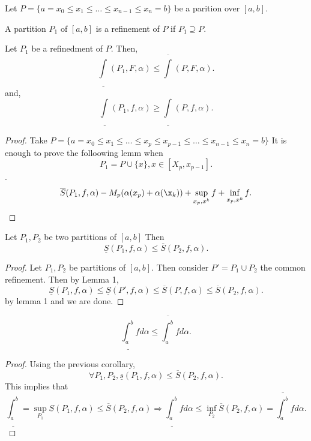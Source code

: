 \documentclass[a4paper]{article}
\newcommand{\upRint}[2]{
  \overline{\int_{#1}^{#2}}
}
\newcommand{\loRint}[2]{
  \underline{\int_{#1}^{#2}}
}
\begin{document}
Let $P = \{ a = x_0 \leq x_1 \leq \ldots \leq x_{n-1} \leq x_n = b\} $ be a parition over $[a,b]$.

 \begin{definition}
   A partition $P_1$ of $[a,b]$ is a refinement of  $P$ if  $P_1 \supseteq P$. 
\end{definition}

\begin{lemma}
  Let $P_1$ be a refinedment of $P$. Then,
  \[
    \loRint{}{}(P_1, F, \alpha) \leq \upRint{}{} (P, F, \alpha)
  .\] 
  and,
  \[
    \loRint{}{} (P_1, f, \alpha) \geq \loRint{}{} (P, f, \alpha) 
  .\] 

  \begin{proof}
    Take $P = \{a = x_0 \leq x_1 \leq \ldots \leq x_p \leq x_{p-1} \leq \ldots \leq x_{n-1} \leq x_n = b\} $ It is enough to prove the folloowing lemm when 
    \[
      P_1 = P \cup \{x\}, x \in [X_{p}, x_{p-1}] 
    .\].
    \begin{align*}
          \overline{S} (P_1, f, \alpha)  -M_{p}(\alpha (x_p) + \alpha(\x_k)) + \sup_{x_{p}, x^{k}} f + \inf_{x_p, x^{k}} f 
        .\end{align*}
  \end{proof}
\end{lemma}


\begin{corollary}
  Let $P_1, P_2$ be two partitions of $[a,b]$ Then 
   \[
     \underline{S} (P_1, f, \alpha) \leq \overline{S} (P_2, f, \alpha) 
  .\]

  \begin{proof}
    Let $P_1, P_2$ be partitions of $[a,b]$. Then consider  $P' = P_1 \cup P_2$ the common refinement. Then by Lemma 1,
    \[
      \underline{S} (P_1, f, \alpha) \leq \underline{S} (P', f, \alpha) \leq \overline{S} (P, f, \alpha) \leq \overline{S} (P_2, f, \alpha) 
    .\] by lemma 1 and we are done.
  \end{proof}
\end{corollary}

\begin{corollary}
  \[
    \loRint{a}{b} f d \alpha \leq \upRint{a}{b} f d\alpha  
  .\] 

  \noindent\hrulefill 

  \begin{proof}
    Using the previous corollary, \[
      \forall P_1, P_2, \underline{s} (P_1, f, \alpha) \leq \overline{S}(P_2, f, \alpha)
    .\] 
    This implies that 
    \[
      \loRint{a}{b} = \sup_{P_1} \underline{S} (P_1, f, \alpha) \leq \overline{S} (P_2, f, \alpha) \Rightarrow
      \loRint{a}{b} f d\alpha \leq \inf_{P_2} \overline{S} (P_2, f, \alpha) = \upRint{a}{b} f d \alpha
    .\] 
  \end{proof}
\end{corollary}
\end{document}
